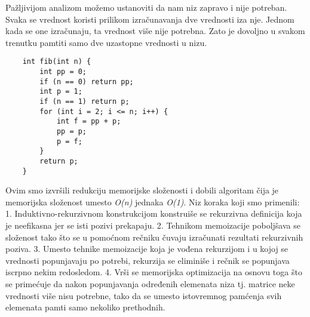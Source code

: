 \documentclass{article}
\begin{document}
Pažljivijom analizom možemo ustanoviti da nam niz zapravo i nije potreban. Svaka se vrednost
koristi prilikom izračunavanja dve vrednosti iza nje. Jednom kada se one
izračunaju, ta vrednost više nije potrebna. Zato je dovoljno u svakom trenutku
pamtiti samo dve uzastopne vrednosti u nizu.
\newpage
\begin{lstlisting}
    int fib(int n) {
        int pp = 0;
        if (n == 0) return pp;
        int p = 1;
        if (n == 1) return p;
        for (int i = 2; i <= n; i++) {
            int f = pp + p;
            pp = p;
            p = f;
        }
        return p;
    }
\end{lstlisting}
Ovim smo izvršili redukciju memorijske složenosti i dobili algoritam čija je
memorijska složenost umesto \textit{O(n)} jednaka \textit{O(1)}.
\newline
Niz koraka koji smo primenili:
\newline \hspace*{0.3cm}1. Induktivno-rekurzivnom konstrukcijom konstruiše se rekurzivna definicija
koja je neefikasna jer se isti pozivi prekapaju.
\newline \hspace*{0.3cm}2. Tehnikom memoizacije poboljšava se složenost tako što se u pomoćnom
rečniku čuvaju izračunati rezultati rekurzivnih poziva.
\newline \hspace*{0.3cm}3. Umesto tehnike memoizacije koja je vođena rekurzijom i u kojoj se vrednosti
popunjavaju po potrebi, rekurzija se eliminiše i rečnik se
popunjava iscrpno nekim redosledom.
\newline \hspace*{0.3cm}4. Vrši se memorijska optimizacija na osnovu toga što se primećuje da nakon
popunjavanja određenih elemenata niza tj. matrice neke vrednosti više nisu potrebne, tako da se umesto
istovremnog pamćenja svih elemenata pamti samo nekoliko prethodnih.
\end{document}
